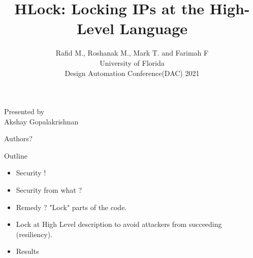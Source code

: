 \documentclass[xcolor=dvipsnames]{beamer}
\title{HLock: Locking IPs at the High-Level Language}
\subtitle{Rafid M., Roshanak M., Mark T. and Farimah F \\ University of Florida \\ Design Automation Conference(DAC) 2021}
\begin{document}
    
    \begin{frame}

        \maketitle

        Presented by \\ Akshay Gopalakrishnan

    \end{frame}

    \begin{frame}{Authors?}


        
    \end{frame}

    \begin{frame}{Outline}

        \begin{itemize}
            \item Security ! 
            \item Security from what ? 
            \item Remedy ? "Lock" parts of the code. 
            \item Lock at High Level description to avoid attackers from succeeding (resiliency).
            \item Results
        \end{itemize}
        
    \end{frame}

    
\end{document}
